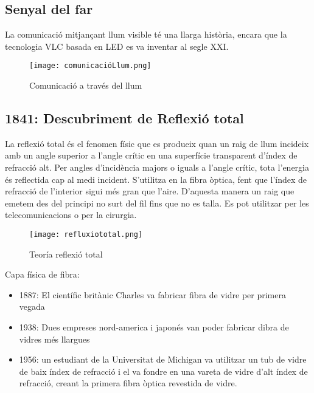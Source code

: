\subsection*{Senyal del far}


La comunicació mitjançant llum visible té una llarga història, encara que la tecnologia VLC basada en LED es va inventar al segle XXI. 

\begin{figure}[h!]
    \centering
    \texttt{[image: comunicacióLlum.png]}
    \caption{Comunicació a través del llum}
\end{figure}


\subsection*{1841: Descubriment de Reflexió total}

La reflexió total és el fenomen físic que es produeix quan un raig de llum incideix amb un angle superior a l'angle crític en una superfície transparent d'índex de refracció alt. Per angles d'incidència majors o iguals a l'angle crític, tota l'energia és reflectida cap al medi incident.
S'utilitza en la fibra òptica, fent que l'índex de refracció de l'interior sigui més gran que l'aire. D'aquesta manera un raig que emetem des del principi no surt del fil fins que no es talla. Es pot utilitzar per les telecomunicacions o per la cirurgia.

\begin{figure}[h!]
    \centering
    \texttt{[image: refluxiototal.png]}
    \caption{Teoría reflexió total}
\end{figure}


Capa física de fibra: 
\begin{itemize}
    \item 1887: El científic britànic Charles va fabricar fibra de vidre per primera vegada
    \item 1938: Dues empreses nord-america i japonés van poder fabricar dibra de vidres més llargues
    \item 1956: un estudiant de la Universitat de Michigan va utilitzar un tub de vidre de baix índex de refracció i el va fondre en una vareta de vidre d'alt índex de refracció, creant la primera fibra òptica revestida de vidre. 

\end{itemize}

